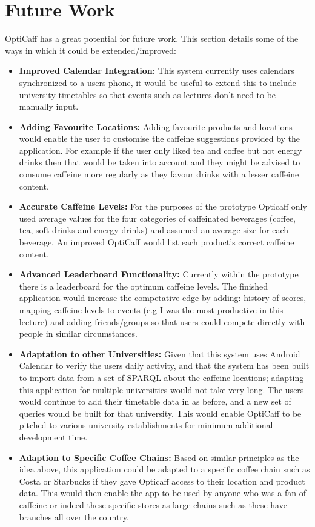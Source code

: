 \section{Future Work}

OptiCaff has a great potential for future work. This section details some of the ways in which it could be extended/improved:

\begin{itemize}
	\item{\textbf{Improved Calendar Integration:}
		This system currently uses calendars synchronized to a users phone, it would be useful to extend this to include  		    university timetables so that events such as lectures don't need to be manually input.
	}
	\item{\textbf{Adding Favourite Locations:}
		Adding favourite products and locations would enable the user to customise the caffeine 
		suggestions provided by the application. For example if the user only liked tea and coffee but not energy
		drinks then that would be taken into account and they might be advised to consume
		caffeine more regularly as they favour drinks with a lesser caffeine content. 
	}
	\item{\textbf{Accurate Caffeine Levels:}
		For the purposes of the prototype Opticaff only used average values for the four categories of caffeinated
		beverages (coffee, tea, soft drinks and energy drinks) and assumed an average size for each beverage. An
		improved OptiCaff would list each product's correct caffeine content.
	}
	\item{\textbf{Advanced Leaderboard Functionality:}
	Currently within the prototype there is a leaderboard for the optimum caffeine levels. The finished application
	would increase the competative edge by adding: history of scores, mapping caffeine levels to events (e.g I was the
	most productive in this lecture) and adding friends/groups so that users could compete directly with people in
	similar circumstances.
	}
	\item{\textbf{Adaptation to other Universities:}
	Given that this system uses Android Calendar to verify the users daily activity, and that the system has been
	built to import data from a set of SPARQL about the caffeine locations; adapting this application for multiple
	universities would not take very long. The users would continue to add their timetable data in as before, and a
	new set of queries would be built for that university. This would enable OptiCaff to be pitched to various
	university establishments for minimum additional development time.  
	}
	\item{\textbf{Adaption to Specific Coffee Chains:}
	Based on similar principles as the idea above, this application could be adapted to a specific coffee chain such
	as Costa or Starbucks if they gave Opticaff access to their location and product data. This would then enable the 
	app to be used by anyone who was a fan of caffeine or indeed these specific stores as large chains such as these 
	have branches all over the country.
	}
\end{itemize}